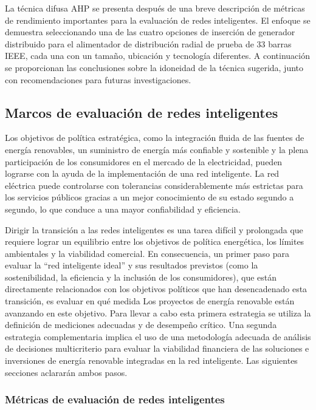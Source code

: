 \documentclass[
]{article}
\begin{document}
La técnica difusa AHP se presenta después de una breve descripción de
métricas de rendimiento importantes para la evaluación de redes
inteligentes. El enfoque se demuestra seleccionando una de las cuatro
opciones de inserción de generador distribuido para el alimentador de
distribución radial de prueba de 33 barras IEEE, cada una con un tamaño,
ubicación y tecnología diferentes. A continuación se proporcionan las
conclusiones sobre la idoneidad de la técnica sugerida, junto con
recomendaciones para futuras investigaciones.

\hypertarget{marcos-de-evaluaciuxf3n-de-redes-inteligentes}{%
\subsection{Marcos de evaluación de redes
inteligentes}\label{marcos-de-evaluaciuxf3n-de-redes-inteligentes}}

Los objetivos de política estratégica, como la integración fluida de las
fuentes de energía renovables, un suministro de energía más confiable y
sostenible y la plena participación de los consumidores en el mercado de
la electricidad, pueden lograrse con la ayuda de la implementación de
una red inteligente. La red eléctrica puede controlarse con tolerancias
considerablemente más estrictas para los servicios públicos gracias a un
mejor conocimiento de su estado segundo a segundo, lo que conduce a una
mayor confiabilidad y eficiencia.

Dirigir la transición a las redes inteligentes es una tarea difícil y
prolongada que requiere lograr un equilibrio entre los objetivos de
política energética, los límites ambientales y la viabilidad comercial.
En consecuencia, un primer paso para evaluar la ``red inteligente
ideal'' y sus resultados previstos (como la sostenibilidad, la
eficiencia y la inclusión de los consumidores), que están directamente
relacionados con los objetivos políticos que han desencadenado esta
transición, es evaluar en qué medida Los proyectos de energía renovable
están avanzando en este objetivo. Para llevar a cabo esta primera
estrategia se utiliza la definición de mediciones adecuadas y de
desempeño crítico. Una segunda estrategia complementaria implica el uso
de una metodología adecuada de análisis de decisiones multicriterio para
evaluar la viabilidad financiera de las soluciones e inversiones de
energía renovable integradas en la red inteligente. Las siguientes
secciones aclararán ambos pasos.

\hypertarget{muxe9tricas-de-evaluaciuxf3n-de-redes-inteligentes}{%
\subsubsection{Métricas de evaluación de redes
inteligentes}\label{muxe9tricas-de-evaluaciuxf3n-de-redes-inteligentes}}
\end{document}
